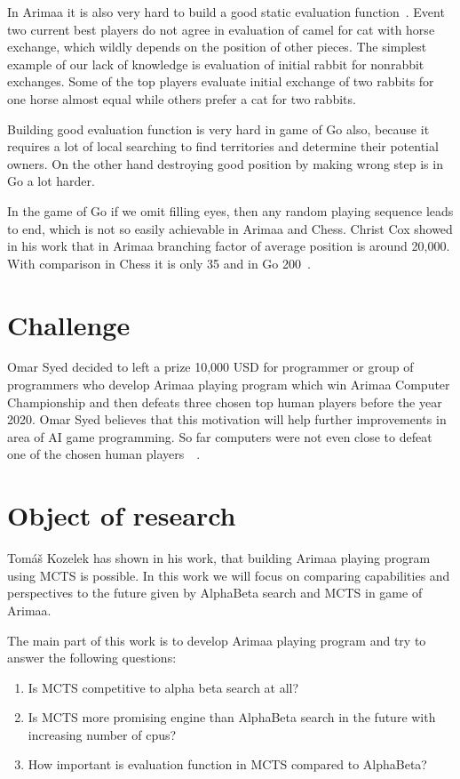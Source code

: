 In Arimaa it is also very hard to build a good static evaluation
function~\cite{WorldChampion}. Event two current best players do not agree in
evaluation of camel for cat with horse exchange, which wildly depends on the
position of other pieces. The simplest example of our lack of knowledge is
evaluation of initial rabbit for nonrabbit exchanges. Some of the top players
evaluate initial exchange of two rabbits for one horse almost equal while
others prefer a cat for two rabbits.

Building good evaluation function is very hard in game of Go also, because it
requires a lot of local searching to find territories and determine their
potential owners. On the other hand destroying good position by making wrong
step is in Go a lot harder.

In the game of Go if we omit filling eyes, then any random playing sequence
leads to end, which is not so easily achievable in Arimaa and Chess. Christ Cox
showed in his work that in Arimaa branching factor of average position is
around 20,000. With comparison in Chess it is only 35 and in Go 200~\cite{COX}.


\section{Challenge}
Omar Syed decided to left a prize 10,000 USD for programmer or group of
programmers who develop Arimaa playing program which win Arimaa Computer
Championship and then defeats three chosen top human players before the year
2020. Omar Syed believes that this motivation will help further improvements in
area of AI game programming. So far computers were not even close to defeat one
of the chosen human players~\cite{arimaa.com}~\cite{syed}.


\section{Object of research}
Tomáš Kozelek has shown in his work, that building Arimaa playing program using
MCTS is possible. In this work we will focus on comparing capabilities and
perspectives to the future given by AlphaBeta search and MCTS in game of
Arimaa.

The main part of this work is to develop Arimaa playing program and try to
answer the following questions:

\begin{enumerate}
\item Is MCTS competitive to alpha beta search at all?
\item Is MCTS more promising engine than AlphaBeta search in the future with
      increasing number of cpus?
\item How important is evaluation function in MCTS compared to AlphaBeta?
\end{enumerate}

